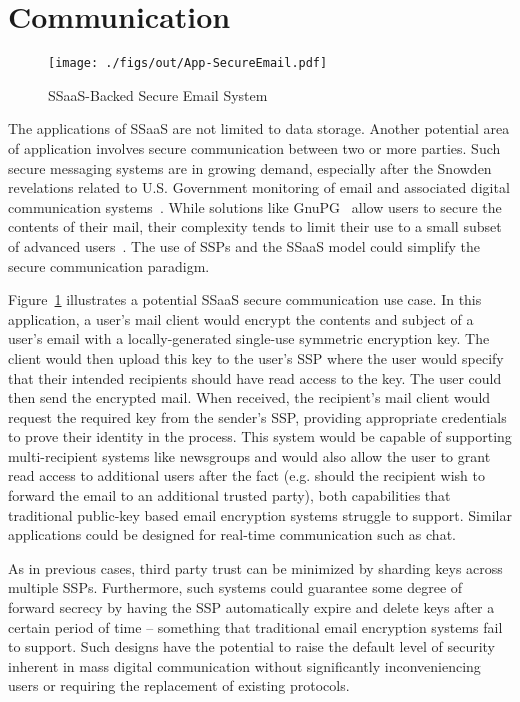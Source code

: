 \section{Communication}

\begin{figure}[t]
  \centering
  \texttt{[image: ./figs/out/App-SecureEmail.pdf]}
  \caption{SSaaS-Backed Secure Email System}
  \label{fig:apps-secureemail}
\end{figure}

The applications of SSaaS are not limited to data storage. Another
potential area of application involves secure communication between
two or more parties. Such secure messaging systems are in growing
demand, especially after the Snowden revelations related to U.S.
Government monitoring of email and associated digital communication
systems~\cite{gellman-muscular, greenwald-collect,
  greenwald-prism}. While solutions like GnuPG~\cite{gnupg} allow
users to secure the contents of their mail, their complexity tends to
limit their use to a small subset of advanced
users~\cite{green-challenge, whitten1999}. The use of SSPs and the
SSaaS model could simplify the secure communication paradigm.

Figure~\ref{fig:apps-secureemail} illustrates a potential SSaaS secure
communication use case. In this application, a user's mail client
would encrypt the contents and subject of a user's email with a
locally-generated single-use symmetric encryption key. The client
would then upload this key to the user's SSP where the user would
specify that their intended recipients should have read access to the
key. The user could then send the encrypted mail. When received, the
recipient's mail client would request the required key from the
sender's SSP, providing appropriate credentials to prove their
identity in the process. This system would be capable of supporting
multi-recipient systems like newsgroups and would also allow the user
to grant read access to additional users after the fact (e.g. should
the recipient wish to forward the email to an additional trusted
party), both capabilities that traditional public-key based email
encryption systems struggle to support. Similar applications could be
designed for real-time communication such as chat.

As in previous cases, third party trust can be minimized by sharding
keys across multiple SSPs. Furthermore, such systems could guarantee
some degree of forward secrecy by having the SSP automatically expire
and delete keys after a certain period of time -- something that
traditional email encryption systems fail to support. Such designs
have the potential to raise the default level of security inherent in
mass digital communication without significantly inconveniencing users
or requiring the replacement of existing protocols.

